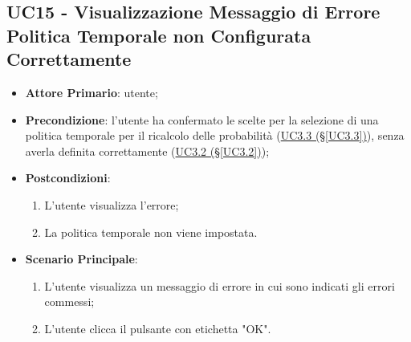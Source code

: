\subsection{UC15 - Visualizzazione Messaggio di Errore Politica Temporale non Configurata Correttamente}\label{UC15}
\begin{itemize}
\item \textbf{Attore Primario}: utente;
\item \textbf{Precondizione}: l'utente ha confermato le scelte per la selezione di una politica temporale per il ricalcolo delle probabilità (\hyperref[UC3.3]{UC3.3 (§\ref*{UC3.3})}), senza averla definita correttamente (\hyperref[UC3.2]{UC3.2 (§\ref*{UC3.2})});
\item \textbf{Postcondizioni}: 
	\begin{enumerate}
	\item L'utente visualizza l'errore;
	\item La politica temporale non viene impostata.
	\end{enumerate}
\item \textbf{Scenario Principale}: 
	\begin{enumerate}
	\item L'utente visualizza un messaggio di errore in cui sono indicati gli errori commessi;
	\item L'utente clicca il pulsante con etichetta "OK".
	\end{enumerate}
\end{itemize}



